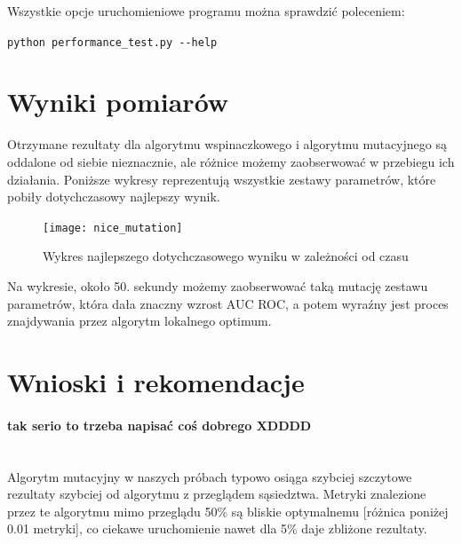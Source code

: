 \documentclass[11pt]{article}
\begin{document}
Wszystkie opcje uruchomieniowe programu można sprawdzić poleceniem:

 \texttt{python performance\_test.py -\--help}

\section{Wyniki pomiarów}
Otrzymane rezultaty dla algorytmu wspinaczkowego i algorytmu mutacyjnego są oddalone od siebie nieznacznie, ale różnice możemy zaobserwować w przebiegu ich działania. Poniższe wykresy reprezentują wszystkie zestawy parametrów, które pobiły dotychczasowy najlepszy wynik.
\begin{figure}[H]
	\caption{Wykres najlepszego dotychczasowego wyniku w zależności od czasu}
	\label{nice_mutation}
	\centering
	\texttt{[image: nice\_mutation]}
\end{figure}
Na wykresie, około 50. sekundy możemy zaobserwować taką mutację zestawu parametrów, która dała znaczny wzrost AUC ROC, a potem wyraźny jest proces znajdywania przez algorytm lokalnego optimum.


\section{Wnioski i rekomendacje}
\paragraph{ tak serio to trzeba napisać coś dobrego XDDDD\\\\}
Algorytm mutacyjny w naszych próbach typowo osiąga szybciej szczytowe rezultaty szybciej od algorytmu z przeglądem sąsiedztwa. Metryki znalezione przez te algorytmu mimo przeglądu 50\% są bliskie optymalnemu [różnica poniżej 0.01 metryki], co ciekawe uruchomienie nawet dla 5\% daje zbliżone rezultaty.
\end{document}
